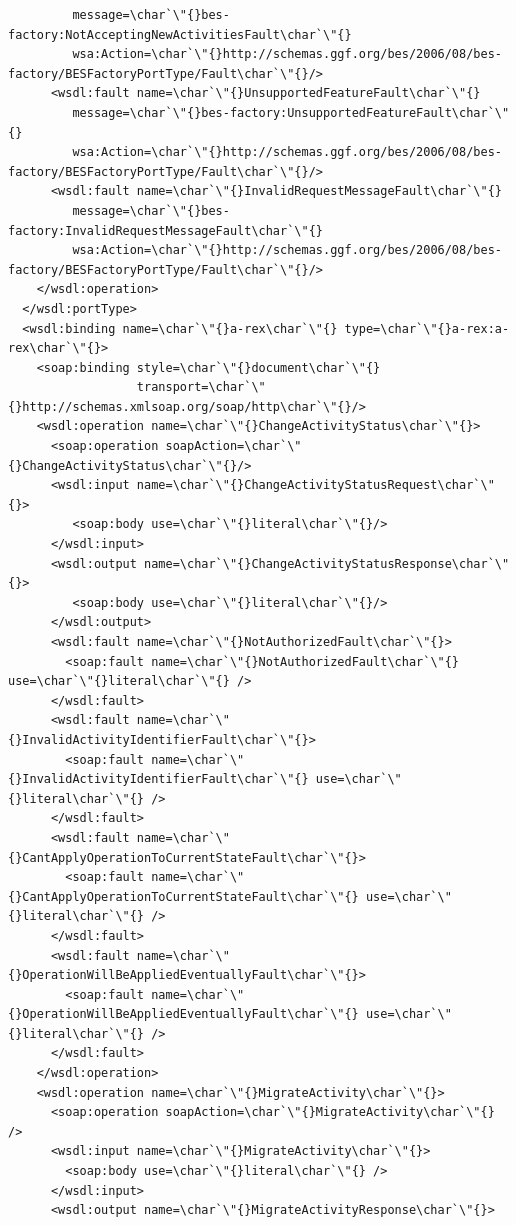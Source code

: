 \documentclass{article}                            %
\begin{document}
\begin{footnotesize}
\begin{verbatim}
         message=\char`\"{}bes-factory:NotAcceptingNewActivitiesFault\char`\"{}
         wsa:Action=\char`\"{}http://schemas.ggf.org/bes/2006/08/bes-factory/BESFactoryPortType/Fault\char`\"{}/>
      <wsdl:fault name=\char`\"{}UnsupportedFeatureFault\char`\"{} 
         message=\char`\"{}bes-factory:UnsupportedFeatureFault\char`\"{}
         wsa:Action=\char`\"{}http://schemas.ggf.org/bes/2006/08/bes-factory/BESFactoryPortType/Fault\char`\"{}/>
      <wsdl:fault name=\char`\"{}InvalidRequestMessageFault\char`\"{}
         message=\char`\"{}bes-factory:InvalidRequestMessageFault\char`\"{}
         wsa:Action=\char`\"{}http://schemas.ggf.org/bes/2006/08/bes-factory/BESFactoryPortType/Fault\char`\"{}/>
    </wsdl:operation>
  </wsdl:portType>
  <wsdl:binding name=\char`\"{}a-rex\char`\"{} type=\char`\"{}a-rex:a-rex\char`\"{}>
    <soap:binding style=\char`\"{}document\char`\"{}
                  transport=\char`\"{}http://schemas.xmlsoap.org/soap/http\char`\"{}/>
    <wsdl:operation name=\char`\"{}ChangeActivityStatus\char`\"{}>
      <soap:operation soapAction=\char`\"{}ChangeActivityStatus\char`\"{}/>
      <wsdl:input name=\char`\"{}ChangeActivityStatusRequest\char`\"{}>
         <soap:body use=\char`\"{}literal\char`\"{}/>
      </wsdl:input>
      <wsdl:output name=\char`\"{}ChangeActivityStatusResponse\char`\"{}>
         <soap:body use=\char`\"{}literal\char`\"{}/>
      </wsdl:output>
      <wsdl:fault name=\char`\"{}NotAuthorizedFault\char`\"{}>
        <soap:fault name=\char`\"{}NotAuthorizedFault\char`\"{} use=\char`\"{}literal\char`\"{} />
      </wsdl:fault>
      <wsdl:fault name=\char`\"{}InvalidActivityIdentifierFault\char`\"{}>
        <soap:fault name=\char`\"{}InvalidActivityIdentifierFault\char`\"{} use=\char`\"{}literal\char`\"{} />
      </wsdl:fault>
      <wsdl:fault name=\char`\"{}CantApplyOperationToCurrentStateFault\char`\"{}>
        <soap:fault name=\char`\"{}CantApplyOperationToCurrentStateFault\char`\"{} use=\char`\"{}literal\char`\"{} />
      </wsdl:fault>
      <wsdl:fault name=\char`\"{}OperationWillBeAppliedEventuallyFault\char`\"{}>
        <soap:fault name=\char`\"{}OperationWillBeAppliedEventuallyFault\char`\"{} use=\char`\"{}literal\char`\"{} />
      </wsdl:fault>
    </wsdl:operation>
    <wsdl:operation name=\char`\"{}MigrateActivity\char`\"{}>
      <soap:operation soapAction=\char`\"{}MigrateActivity\char`\"{} /> 
      <wsdl:input name=\char`\"{}MigrateActivity\char`\"{}>
        <soap:body use=\char`\"{}literal\char`\"{} />
      </wsdl:input>
      <wsdl:output name=\char`\"{}MigrateActivityResponse\char`\"{}>

\end{verbatim}
\end{footnotesize}
\end{document}
